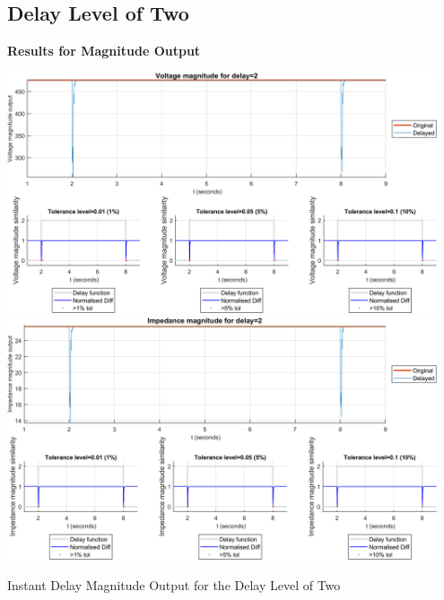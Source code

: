 {\newpage \subsection{Delay Level of Two}
\textbf{Results for Magnitude Output}
\begin{floatingfigure}[p]{\textwidth}
    \includegraphics[width=0.95\textwidth]{PMUsim-figures/DelayOf_2/Instant_vMagnitude.png}    
      \includegraphics[width=0.95\textwidth]{PMUsim-figures/DelayOf_2/Instant_iMagnitude.png}
    \label{fig:PMUsim_Two_Magnitude}
    \caption{Instant Delay Magnitude Output for the Delay Level of Two}
\end{floatingfigure}

}
